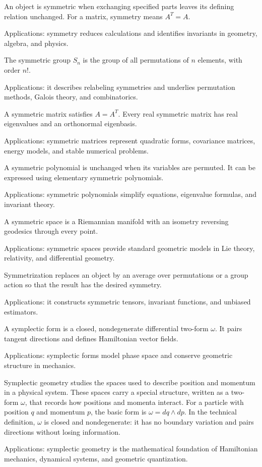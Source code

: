 An object is symmetric when exchanging specified parts leaves its defining relation unchanged. For a matrix, symmetry means $A^T=A$. \par\noindent Applications: symmetry reduces calculations and identifies invariants in geometry, algebra, and physics.

The symmetric group $S_n$ is the group of all permutations of $n$ elements, with order $n!$. \par\noindent Applications: it describes relabeling symmetries and underlies permutation methods, Galois theory, and combinatorics.

A symmetric matrix satisfies $A=A^T$. Every real symmetric matrix has real eigenvalues and an orthonormal eigenbasis. \par\noindent Applications: symmetric matrices represent quadratic forms, covariance matrices, energy models, and stable numerical problems.

A symmetric polynomial is unchanged when its variables are permuted. It can be expressed using elementary symmetric polynomials. \par\noindent Applications: symmetric polynomials simplify equations, eigenvalue formulas, and invariant theory.

A symmetric space is a Riemannian manifold with an isometry reversing geodesics through every point. \par\noindent Applications: symmetric spaces provide standard geometric models in Lie theory, relativity, and differential geometry.

Symmetrization replaces an object by an average over permutations or a group action so that the result has the desired symmetry. \par\noindent Applications: it constructs symmetric tensors, invariant functions, and unbiased estimators.

A symplectic form is a closed, nondegenerate differential two-form $\omega$. It pairs tangent directions and defines Hamiltonian vector fields. \par\noindent Applications: symplectic forms model phase space and conserve geometric structure in mechanics.

Symplectic geometry studies the spaces used to describe position and momentum in a physical system. These spaces carry a special structure, written as a two-form $\omega$, that records how positions and momenta interact. For a particle with position $q$ and momentum $p$, the basic form is $\omega=dq\wedge dp$. In the technical definition, $\omega$ is closed and nondegenerate: it has no boundary variation and pairs directions without losing information. \par\noindent Applications: symplectic geometry is the mathematical foundation of Hamiltonian mechanics, dynamical systems, and geometric quantization.

